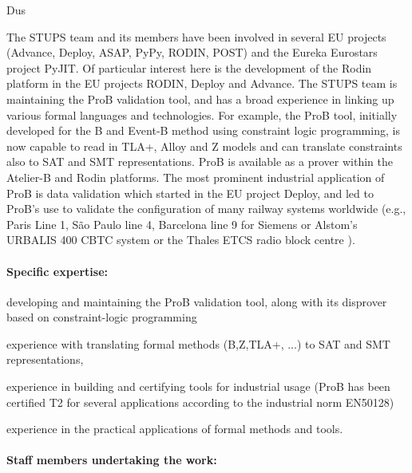 \begin{sitedescription}{Dus}


The STUPS team and its members have been involved in several EU projects
 (Advance, Deploy, ASAP, PyPy, RODIN, POST) and the Eureka Eurostars project PyJIT.
Of particular interest here is the development of the Rodin platform in the EU projects RODIN, Deploy and Advance.
The STUPS team is maintaining the ProB validation tool, and has a broad experience
 in linking up various formal languages and technologies.
For example, the ProB tool, initially developed for the B and Event-B method using constraint logic programming,
 is now capable to read in TLA+, Alloy and Z models and
 can translate constraints also to SAT and SMT representations.
ProB is available as a prover within the Atelier-B and Rodin platforms.
The most prominent industrial application of ProB is
 data validation which started in the EU project Deploy, and led to
 ProB's use to validate the configuration of many railway systems worldwide
 (e.g.,
 Paris Line 1,  S\~{a}o Paulo line 4, Barcelona line 9 for Siemens
 or Alstom's URBALIS 400 CBTC system %
 or the Thales ETCS radio block centre
 ).

\paragraph{Specific expertise:}

\begin{compactitem}
\item %
      developing and maintaining the ProB validation tool, along with
      its disprover based on constraint-logic programming
 \item experience with translating formal methods (B,Z,TLA+, ...)
       to SAT and SMT representations,
 \item experience in building and certifying tools for industrial usage (ProB has been certified T2
  for several applications according to the industrial norm EN50128)
 \item experience in the practical applications of formal methods and tools.
\end{compactitem}

\paragraph{Staff members undertaking the work:}


\end{sitedescription}
